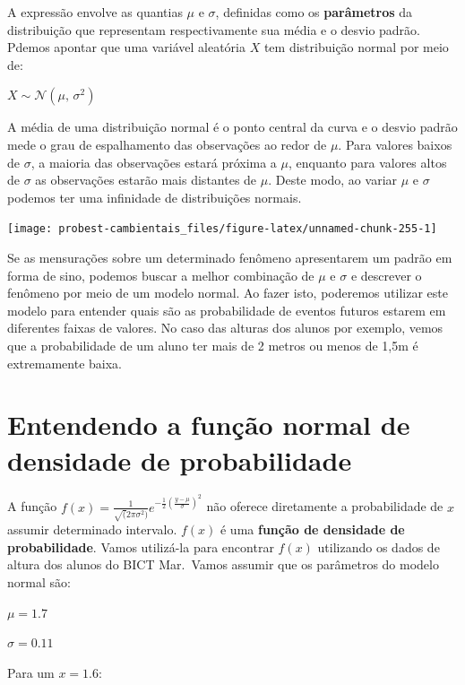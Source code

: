 \documentclass[
]{book}
\begin{document}
A expressão envolve as quantias \(\mu\) e \(\sigma\), definidas como os \textbf{parâmetros} da distribuição que representam respectivamente sua média e o desvio padrão. Pdemos apontar que uma variável aleatória \(X\) tem distribuição normal por meio de:

\(X \sim \mathcal{N}(\mu,\,\sigma^2)\)

A média de uma distribuição normal é o ponto central da curva e o desvio padrão mede o grau de espalhamento das observações ao redor de \(\mu\). Para valores baixos de \(\sigma\), a maioria das observações estará próxima a \(\mu\), enquanto para valores altos de \(\sigma\) as observações estarão mais distantes de \(\mu\). Deste modo, ao variar \(\mu\) e \(\sigma\) podemos ter uma infinidade de distribuições normais.

\begin{center}\texttt{[image: probest-cambientais\_files/figure-latex/unnamed-chunk-255-1]} \end{center}

Se as mensurações sobre um determinado fenômeno apresentarem um padrão em forma de sino, podemos buscar a melhor combinação de \(\mu\) e \(\sigma\) e descrever o fenômeno por meio de um modelo normal. Ao fazer isto, poderemos utilizar este modelo para entender quais são as probabilidade de eventos futuros estarem em diferentes faixas de valores. No caso das alturas dos alunos por exemplo, vemos que a probabilidade de um aluno ter mais de 2 metros ou menos de 1,5m é extremamente baixa.

\hypertarget{entendendo-a-funuxe7uxe3o-normal-de-densidade-de-probabilidade}{%
\section{Entendendo a função normal de densidade de probabilidade}\label{entendendo-a-funuxe7uxe3o-normal-de-densidade-de-probabilidade}}

A função \(f(x) = \frac{1}{\sqrt(2\pi\sigma^2)}e^{-\frac{1}{2}(\frac{y-\mu}{\sigma})^2}\) não oferece diretamente a probabilidade de \(x\) assumir determinado intervalo. \(f(x)\) é uma \textbf{função de densidade de probabilidade}. Vamos utilizá-la para encontrar \(f(x)\) utilizando os dados de altura dos alunos do BICT Mar.~Vamos assumir que os parâmetros do modelo normal são:

\(\mu = 1.7\)

\(\sigma = 0.11\)

Para um \(x = 1.6\):
\end{document}
